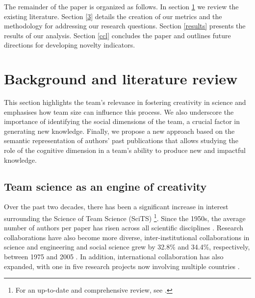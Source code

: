 


The remainder of the paper is organized as follows. In section \ref{lit} we review the existing literature. Section \ref{3} details the creation of our metrics and the methodology for addressing our research questions. Section \ref{results} presents the results of our analysis. Section  \ref{ccl} concludes the paper and outlines future directions for developing novelty indicators.

\section{Background and literature review}
\label{lit}

This section highlights the team's relevance in fostering creativity in science and emphasises how team size can influence this process. We also underscore the importance of identifying the social dimensions of the team, a crucial factor in generating new knowledge. Finally, we propose a new approach based on the semantic representation of authors' past publications that allows studying the role of the cognitive dimension in a team's ability to produce new and impactful knowledge.



 \subsection{Team science as an engine of creativity}
 
        Over the past two decades, there has been a significant increase in interest surrounding the Science of Team Science (SciTS) \citep{falk2011mapping}\footnote{ \justifying For an up-to-date and comprehensive review, see \cite{wang2021science}.}. Since the 1950s, the average number of authors per paper has risen across all scientific disciplines \citep{wuchty2007increasing}. Research collaborations have also become more diverse, inter-institutional collaborations in science and engineering and social science grew by 32.8\% and 34.4\%, respectively, between 1975 and 2005 \citep{jones2008multi}. In addition, international collaboration has also expanded, with one in five research projects now involving multiple countries \citep{xie2012american}.

